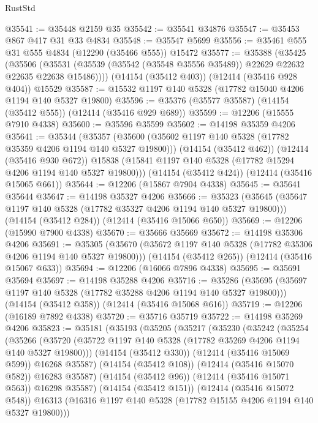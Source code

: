 \begin{lexlean}{RustStd}
\begin{coremodule}
@35541 := @35448 @2159 @35
@35542 := @35541 @34876
@35547 := @35453 @867 @417 @31 @33 @4834
@35548 := @35547 @5699
@35556 := @35461 @555 @31 @555 @4834 (@12290 (@35466 @555)) @15472
@35577 := @35388
    (@35425
      (@35506 (@35531 (@35539 (@35542 (@35548 @35556 @35489)) @22629 @22632 @22635 @22638 @15486))))
    (@14154 (@35412 @403))
    (@12414 (@35416 @928 @404))
    @15529
@35587 := @15532 @1197 @140 @5328 (@17782 @15040 @4206 @1194 @140 @5327 @19800)
@35596 := @35376 (@35577 @35587) (@14154 (@35412 @555)) (@12414 (@35416 @929 @689))
@35599 := @12206 (@15555 @7910 @4338)
@35600 := @35596 @35599
@35602 := @14198 @35359 @4206
@35641 := @35344
    (@35357
      (@35600 (@35602 @1197 @140 @5328 (@17782 @35359 @4206 @1194 @140 @5327 @19800)))
      (@14154 (@35412 @462))
      (@12414 (@35416 @930 @672))
      @15838
      (@15841 @1197 @140 @5328 (@17782 @15294 @4206 @1194 @140 @5327 @19800)))
    (@14154 (@35412 @424))
    (@12414 (@35416 @15065 @661))
@35644 := @12206 (@15867 @7904 @4338)
@35645 := @35641 @35644
@35647 := @14198 @35327 @4206
@35666 := @35323
    (@35645 (@35647 @1197 @140 @5328 (@17782 @35327 @4206 @1194 @140 @5327 @19800)))
    (@14154 (@35412 @284))
    (@12414 (@35416 @15066 @650))
@35669 := @12206 (@15990 @7900 @4338)
@35670 := @35666 @35669
@35672 := @14198 @35306 @4206
@35691 := @35305
    (@35670 (@35672 @1197 @140 @5328 (@17782 @35306 @4206 @1194 @140 @5327 @19800)))
    (@14154 (@35412 @265))
    (@12414 (@35416 @15067 @633))
@35694 := @12206 (@16066 @7896 @4338)
@35695 := @35691 @35694
@35697 := @14198 @35288 @4206
@35716 := @35286
    (@35695 (@35697 @1197 @140 @5328 (@17782 @35288 @4206 @1194 @140 @5327 @19800)))
    (@14154 (@35412 @358))
    (@12414 (@35416 @15068 @616))
@35719 := @12206 (@16189 @7892 @4338)
@35720 := @35716 @35719
@35722 := @14198 @35269 @4206
@35823 := @35181
    (@35193
      (@35205
        (@35217
          (@35230
            (@35242
              (@35254
                (@35266
                  (@35720 (@35722 @1197 @140 @5328 (@17782 @35269 @4206 @1194 @140 @5327 @19800)))
                  (@14154 (@35412 @330))
                  (@12414 (@35416 @15069 @599))
                  @16268
                  @35587)
                (@14154 (@35412 @108))
                (@12414 (@35416 @15070 @582))
                @16283
                @35587)
              (@14154 (@35412 @96))
              (@12414 (@35416 @15071 @563))
              @16298
              @35587)
            (@14154 (@35412 @151))
            (@12414 (@35416 @15072 @548))
            @16313
            (@16316 @1197 @140 @5328 (@17782 @15155 @4206 @1194 @140 @5327 @19800)))

\end{coremodule}
\end{lexlean}
